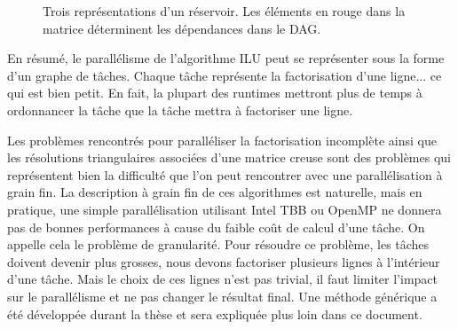 \begin{figure}[!ht]
     \begin{center}
    \end{center}
    \caption{Trois représentations d'un réservoir. Les éléments en rouge dans la matrice déterminent les dépendances dans le DAG.}
    \label{fig:exemple_3_dag}
\end{figure}

En résumé, le parallélisme de l'algorithme ILU peut se représenter sous la forme d'un graphe de tâches.
%
Chaque tâche représente la factorisation d'une ligne... ce qui est bien petit.
%
En fait, la plupart des runtimes mettront plus de temps à ordonnancer la tâche que la tâche mettra à factoriser une ligne.


Les problèmes rencontrés pour paralléliser la factorisation incomplète ainsi que les résolutions triangulaires associées d'une matrice creuse sont des problèmes qui représentent bien la difficulté que l'on peut rencontrer avec une parallélisation à grain fin.
%
La description à grain fin de ces algorithmes est naturelle, mais en pratique, une simple parallélisation utilisant Intel TBB ou OpenMP ne donnera pas de bonnes performances à cause du faible coût de calcul d'une tâche.
%
On appelle cela le problème de granularité.
%
Pour résoudre ce problème, les tâches doivent devenir plus grosses, nous devons factoriser plusieurs lignes à l'intérieur d'une tâche.
%
Mais le choix de ces lignes n'est pas trivial, il faut limiter l'impact sur le parallélisme et ne pas changer le résultat final.
%
Une méthode générique a été développée durant la thèse et sera expliquée plus loin dans ce document.

